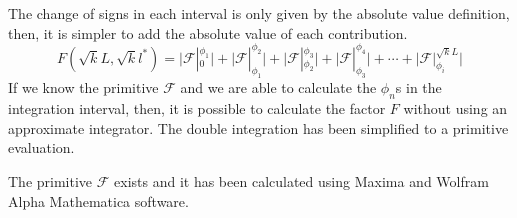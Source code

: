 The change of signs in each interval is only  given by the absolute value definition, then, it is simpler to add the absolute value of each contribution.
\begin{equation}
 F(\sqrt{k}L,\sqrt{k}l^*)= \bigr\vert\mathscr{F}|_0^{\phi_1}\bigr\vert + \bigr\vert\mathscr{F}|_{\phi_1}^{\phi_2}\bigr\vert +  \bigr\vert\mathscr{F}|_{\phi_2}^{\phi_3}\bigr\vert + \bigr\vert\mathscr{F}|_{\phi_3}^{\phi_4}\bigr\vert + \cdots +\bigr\vert\mathscr{F}|_{\phi_i}^{\sqrt{k}L}\bigr\vert
\end{equation}
If we know the primitive $\mathscr{F}$ and we are able to calculate the $\phi_n$s in the integration interval, then, it is possible to calculate the factor $F$ without using an approximate integrator. The double integration has been simplified to a primitive evaluation.\par
The primitive $\mathscr{F}$ exists and it has been calculated using Maxima \cite{Maxima} and Wolfram Alpha Mathematica\cite{Wolfram} software.
